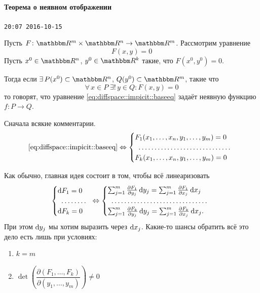 \documentclass[12pt,timbord]{../../../notes}
\begin{document}
\paragraph{Теорема о неявном отображении}
\label{par:diffspace::implicit}

\verb+20:07 2016-10-15+

\begin{defn}\label{defn:diffspace::implicit}
  Пусть $F \colon \R^m\times\R^n \to \R^m$. Рассмотрим уравнение
  \begin{equation}
    F(x, y) = 0
    \label{eq:diffspace::impicit::baseeq}
  \end{equation}
  Пусть $x^0\in \R^n$, $y^0\in \R^k$ такие, что $F(x^0, y^0) = 0$.
 
  Тогда если $\exists\,P(x^0) \subset \R^n$, $Q(y^0) \subset \R^m$, такие что
  \[
    \forall\, x\in P \; \exists!\, y\in Q \colon F(x,y) = 0
  \]
  то говорят, что уравнение \eqref{eq:diffspace::impicit::baseeq} задаёт неявную функцию 
  $f\colon P \to Q$.
\end{defn}

Сначала всякие комментарии.
\begin{equation*}
  \text{\eqref{eq:diffspace::impicit::baseeq}} \Leftrightarrow
  \begin{cases}
    F_1(x_1, \dotsc, x_n, y_1, \dotsc, y_m) = 0 \\
    \hdotsfor{1}\\
    F_k(x_1, \dotsc, x_n, y_1, \dotsc, y_m) = 0 \\
  \end{cases}
\end{equation*}

Как обычно, главная идея состоит в том, чтобы всё линеаризовать
\begin{equation}
  \begin{cases}
    \del F_1 = 0 \\
    \hdotsfor{1}\\
    \del F_k = 0 \\
  \end{cases}
  \Leftrightarrow 
  \begin{cases}
    \sum_{j=1}^m \frac{\partial F_1}{\partial y_j}\, \del y_j = 
    \sum_{j=1}^m \frac{\partial F_1}{\partial x_j}\, \del x_j \\
    \hdotsfor{1}\\
    \sum_{j=1}^m \frac{\partial F_k}{\partial y_j}\, \del y_j = 
    \sum_{j=1}^m \frac{\partial F_k}{\partial x_j}\, \del x_j .\\
  \end{cases}\nolinebreak\label{eq:diffspace::impicit::diff}
\end{equation}
При этом $\mathrm{d} y_j$ мы хотим выразить через $\mathrm{d} x_j$.
Какие-то шансы обратить всё это дело есть лишь при условиях:
\begin{enumerate}
  \item $k=m$
  \item $\det \left(\dfrac{\partial(F_1, \dotsc, F_k)}{\partial(y_1, \dotsc, y_m)}\right) \neq 0$
\end{enumerate}
\end{document}
